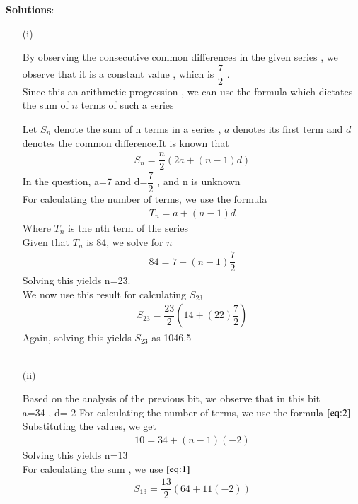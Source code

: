 \documentclass[journal,12pt,twocolumn]{IEEEtran}
\theoremstyle{remark}
\begin{document}
\vspace{0.5cm}
\textbf{Solutions}:
\begin{enumerate}
\item[(i)]   

By observing the consecutive common differences in the given series , we observe that it is a constant value , which is $\dfrac{7}{2}$ .\\
Since this an arithmetic progression , we can use the formula which dictates the sum of $n$ terms of such a series

Let  $S_n$  denote the sum of n terms in a series , $a$ denotes its first term and $d$ denotes the common difference.It is known that
\begin{align}
{S_n} = \dfrac{n}{2}(2a + (n-1)d)\label{eq:1}
\end{align}
In the question, a=7 and d=$\dfrac{7}{2}$ , and  n  is unknown\\
For calculating the number of terms, we use the formula
\begin{align}
{T_n} = a + (n-1)d\label{eq:2}
\end{align}
Where $T_n$ is the nth term of the series\\
Given that $T_n$ is 84, we solve for $n$
\begin{align}  
84 = 7+(n-1)\dfrac{7}{2}
\end{align}
Solving this yields n=23.\\
We now use this result for calculating $S_{23}$
\begin{align}
    S_{23} = \dfrac{23}{2}(14+(22)\dfrac{7}{2})
    \end{align}
Again, solving this yields $S_{23}$ as 1046.5\\\\

\item[(ii)]

\vspace{0.5cm}
Based on the analysis of the previous bit, we observe that in this bit \\ a=34 , d=-2
For calculating the number of terms, we use the formula $\eqref{eq:2}$\\
Substituting the values, we get
\begin{align}
     10 = 34 + (n-1)(-2)
     \end{align}
Solving this yields n=13\\
For calculating the sum , we use $\eqref{eq:1}$
\begin{align}
 S_{13} = \dfrac{13}{2}(64+11(-2))
 \end{align}


\end{enumerate}
\end{document}
